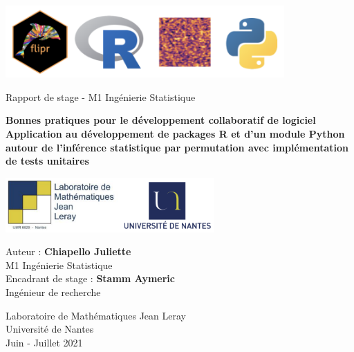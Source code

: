 \documentclass{article}
\begin{document}
\begin{titlepage}
   \begin{center}
   \vspace{-1cm}
	 \includegraphics[width=0.8\textwidth]{logo.png}
	  \vspace{1cm}
	  
	  \LARGE Rapport de stage - M1 Ingénierie Statistique
       
       \vspace{2.5cm}
       \large
       
        \textbf{Bonnes pratiques pour le développement collaboratif de logiciel \\
       \vspace{0.5cm}
        Application au développement de packages R et d’un module Python autour de l’inférence statistique par permutation avec implémentation de tests unitaires}
            
       \vspace{3.5cm}

      

       \vfill
            
       

      \includegraphics[width=0.6\textwidth]{logoNantes.png}
      
		\vspace{0.8cm}
		
      Auteur :  \textbf{Chiapello Juliette} \\
      M1 Ingénierie Statistique\\
      \vspace{0.3cm}
      Encadrant de stage  :  \textbf{Stamm Aymeric}\\
      Ingénieur de recherche
       
       \vspace{0.8cm}
       
       Laboratoire de Mathématiques Jean Leray\\
       Université de Nantes\\
       Juin - Juillet 2021
            
   \end{center}
\end{titlepage}
\end{document}
